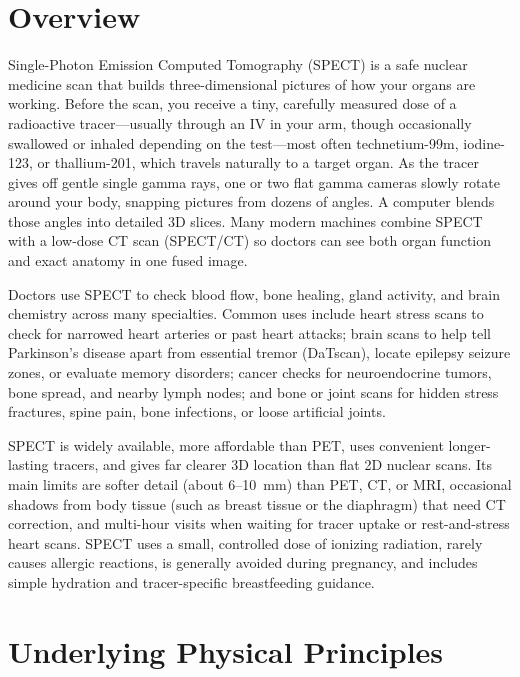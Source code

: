 \label{ch:infographic-spect}

\section{Overview}

Single-Photon Emission Computed Tomography (SPECT) is a safe nuclear medicine scan that builds three-dimensional pictures of how your organs are working. Before the scan, you receive a tiny, carefully measured dose of a radioactive tracer---usually through an IV in your arm, though occasionally swallowed or inhaled depending on the test---most often technetium-99m, iodine-123, or thallium-201, which travels naturally to a target organ. As the tracer gives off gentle single gamma rays, one or two flat gamma cameras slowly rotate around your body, snapping pictures from dozens of angles. A computer blends those angles into detailed 3D slices. Many modern machines combine SPECT with a low-dose CT scan (SPECT/CT) so doctors can see both organ function and exact anatomy in one fused image.

Doctors use SPECT to check blood flow, bone healing, gland activity, and brain chemistry across many specialties. Common uses include heart stress scans to check for narrowed heart arteries or past heart attacks; brain scans to help tell Parkinson's disease apart from essential tremor (DaTscan), locate epilepsy seizure zones, or evaluate memory disorders; cancer checks for neuroendocrine tumors, bone spread, and nearby lymph nodes; and bone or joint scans for hidden stress fractures, spine pain, bone infections, or loose artificial joints.

SPECT is widely available, more affordable than PET, uses convenient longer-lasting tracers, and gives far clearer 3D location than flat 2D nuclear scans. Its main limits are softer detail (about 6--10~mm) than PET, CT, or MRI, occasional shadows from body tissue (such as breast tissue or the diaphragm) that need CT correction, and multi-hour visits when waiting for tracer uptake or rest-and-stress heart scans. SPECT uses a small, controlled dose of ionizing radiation, rarely causes allergic reactions, is generally avoided during pregnancy, and includes simple hydration and tracer-specific breastfeeding guidance.

\section{Underlying Physical Principles}

